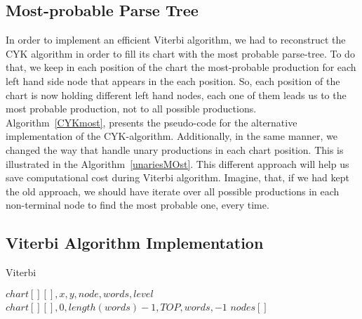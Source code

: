 \documentclass[a4paper,11pt]{article}
\begin{document}
\subsection{Most-probable Parse Tree}
In order to implement an efficient Viterbi algorithm, we had to reconstruct the CYK algorithm in order to fill its chart with the most probable parse-tree. To do that, we keep in each position of the chart the most-probable production for each left hand side node that appears in the each position. So, each position of the chart is now holding different left hand nodes, each one of them leads us to the most probable production, not to all possible productions. Algorithm~\ref{CYKmost}, presents the pseudo-code for the alternative implementation of the CYK-algorithm. Additionally, in the same manner, we changed the way that handle unary productions in each chart position. This is illustrated in the Algorithm~\ref{unariesMOst}. This different approach will help us save computational cost during Viterbi algorithm. Imagine, that, if we had kept the old approach, we should have iterate over all possible productions in each non-terminal node to find the most probable one, every time.

\subsection{Viterbi Algorithm Implementation}


\begin{algorithm}[t!]
\caption{Viterbi}
\label{viterbi}
\begin{small}
\begin{algorithmic}[1]
$chart[][],x,y,node,words,level$
$chart[][],0,length(words)-1,TOP,words,-1$
 $nodes[]$
\ELSE
{}
\ELSE
{}
\ENDIF
\ENDIF
{}
\ENDIF
{}
\RETURN
\ELSE
{}
\RETURN
\ENDIF
\ELSE
\RETURN
\ENDIF
\end{algorithmic}
\end{small}
\end{algorithm}
\end{document}
